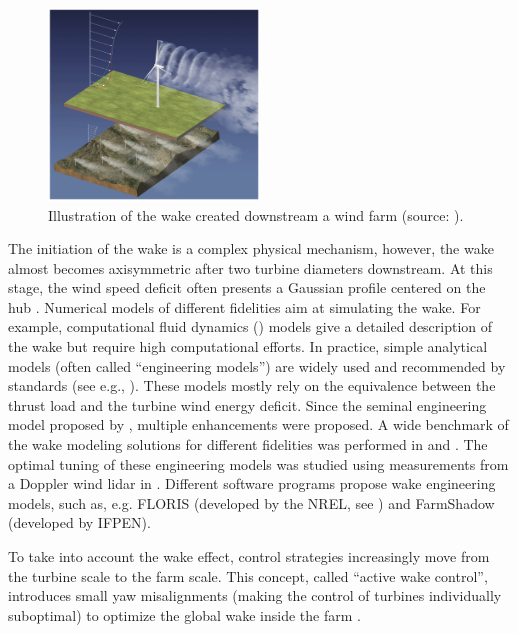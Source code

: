 \begin{figure}%
    \centering
    \includegraphics[width=0.5\textwidth]{./part1/figures/wake.png}
    \caption{Illustration of the wake created downstream a wind farm (source: \citealp{veers_2019_review}).} 
    \label{fig:wake_illustration}
\end{figure}

The initiation of the wake is a complex physical mechanism, however, the wake almost becomes axisymmetric after two turbine diameters downstream. 
At this stage, the wind speed deficit often presents a Gaussian profile centered on the hub \citep{burton_2021_wind_handbook}. 
Numerical models of different fidelities aim at simulating the wake. 
For example, computational fluid dynamics () models give a detailed description of the wake but require high computational efforts. 
In practice, simple analytical models (often called ``engineering models'') are widely used and recommended by standards (see e.g., \citealp[Appendix E]{iec_2019}). 
These models mostly rely on the equivalence between the thrust load and the turbine wind energy deficit. 
Since the seminal engineering model proposed by \citet{jensen_1983_wake}, multiple enhancements were proposed. 
A wide benchmark of the wake modeling solutions for different fidelities was performed in \citet{doubrawa_2020_benchmark} and \citet{hiperwind_2023_wp3}. 
The optimal tuning of these engineering models was studied using measurements from a Doppler wind lidar in \citet{zhan_2020_optimal_wake}. 
Different software programs propose wake engineering models, such as, e.g. FLORIS (developed by the NREL, see \citealp{fleming_2020_FLORIS}) and FarmShadow (developed by IFPEN\footnotemark). 


To take into account the wake effect, control strategies increasingly move from the turbine scale to the farm scale. 
This concept, called ``active wake control'', introduces small yaw misalignments (making the control of turbines individually suboptimal) to optimize the global wake inside the farm \citep{rott_2018_active_control,simley_2020_active_control,meyers_2022_active_control}. 


